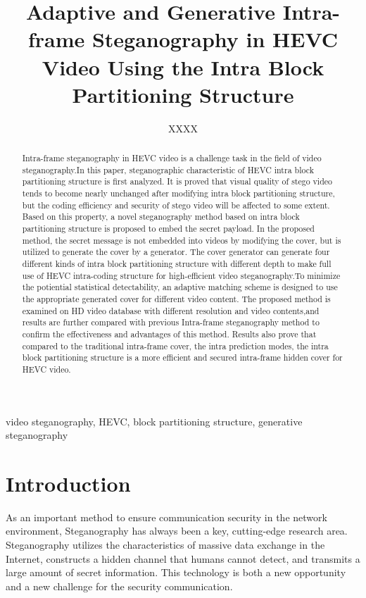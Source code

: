 \documentclass[journal,sort]{IEEEtran}
\begin{document}
\title{Adaptive and Generative Intra-frame Steganography in HEVC Video Using the Intra Block Partitioning Structure}
\author{XXXX}
	

\maketitle

\begin{abstract}
Intra-frame steganography in HEVC video is a challenge task in the field of video steganography.In this paper, steganographic characteristic of HEVC intra block partitioning structure is first analyzed. It is proved that visual quality of stego video tends to become nearly unchanged after modifying intra block partitioning structure, but the coding efficiency and security of stego video will be affected to some extent.
Based on this property, a novel steganography method based on intra block partitioning structure is proposed to embed the secret payload. In the proposed method, the secret message is not embedded into videos by modifying the cover, but is utilized to generate the cover by a generator. The cover generator can generate four different kinds of intra block partitioning structure with different depth to make full use of HEVC intra-coding structure for high-efficient video steganography.To minimize the potiential statistical detectability, an adaptive matching scheme is designed to use the appropriate generated cover for different video content.
The proposed method is examined on HD video database with different resolution and video contents,and results are further compared with previous Intra-frame steganography method to confirm the effectiveness and advantages of this method. Results also prove that compared to the traditional intra-frame cover, the intra prediction modes, the intra block partitioning structure is a more efficient and secured intra-frame hidden cover for HEVC video.


	
	
\end{abstract}	
\begin{IEEEkeywords}
		video steganography, HEVC, block partitioning structure, generative steganography
\end{IEEEkeywords}
	
\section{Introduction\label{intro}}

As an important method to ensure communication security in the network environment, Steganography has always been a key, cutting-edge research area. Steganography utilizes the characteristics of massive data exchange in the Internet, constructs a hidden channel that humans cannot detect, and transmits a large amount of secret information. This technology is both a new opportunity and a new challenge for the security communication.
\end{document}
